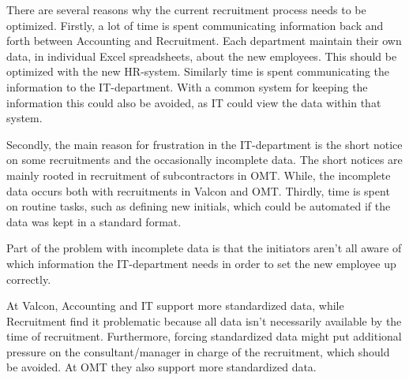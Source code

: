 There are several reasons why the current recruitment process needs to be optimized.
Firstly, a lot of time is spent communicating information back and forth between Accounting and Recruitment. 
Each department maintain their own data, in individual Excel spreadsheets, about the new employees. 
This should be optimized with the new HR-system.
Similarly time is spent communicating the information to the IT-department.
With a common system for keeping the information this could also be avoided, as IT could view the data within that system.

Secondly, the main reason for frustration in the IT-department is the short notice on some recruitments and the occasionally incomplete data.
The short notices are mainly rooted in recruitment of subcontractors in OMT.
While, the incomplete data occurs both with recruitments in Valcon and OMT.
Thirdly, time is spent on routine tasks, such as defining new initials, which could be automated if the data was kept in a standard format.

Part of the problem with incomplete data is that the initiators aren't all aware of which information the IT-department needs in order to set the new employee up correctly.

At Valcon, Accounting and IT support more standardized data, while Recruitment find it problematic because all data isn't necessarily available by the time of recruitment.
Furthermore, forcing standardized data might put additional pressure on the consultant/manager in charge of the recruitment, which should be avoided.
At OMT they also support more standardized data.

